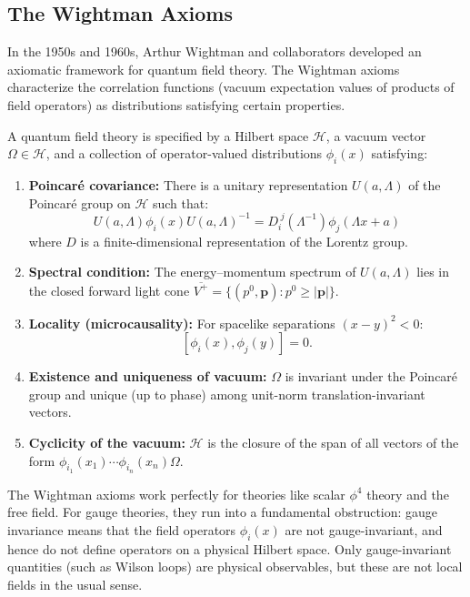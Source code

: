 \subsection{The Wightman Axioms}

In the 1950s and 1960s, Arthur Wightman and collaborators developed an axiomatic framework for quantum field theory. The Wightman axioms characterize the correlation functions (vacuum expectation values of products of field operators) as distributions satisfying certain properties.

\begin{definition}
A quantum field theory is specified by a Hilbert space $\mathcal{H}$, a vacuum vector $\Omega \in \mathcal{H}$, and a collection of operator-valued distributions $\phi_i(x)$ satisfying:
\begin{enumerate}
  \item \textbf{Poincar\'{e} covariance:} There is a unitary representation $U(a, \Lambda)$ of the Poincar\'{e} group on $\mathcal{H}$ such that:
  \[
  U(a, \Lambda) \phi_i(x) U(a, \Lambda)^{-1} = D_i^{\;j}(\Lambda^{-1}) \phi_j(\Lambda x + a)
  \]
  where $D$ is a finite-dimensional representation of the Lorentz group.

  \item \textbf{Spectral condition:} The energy--momentum spectrum of $U(a, \Lambda)$ lies in the closed forward light cone $\overline{V^+} = \{(p^0, \mathbf{p}) : p^0 \ge |\mathbf{p}|\}$.

  \item \textbf{Locality (microcausality):} For spacelike separations $(x - y)^2 < 0$:
  \[
  [\phi_i(x), \phi_j(y)] = 0.
  \]

  \item \textbf{Existence and uniqueness of vacuum:} $\Omega$ is invariant under the Poincar\'{e} group and unique (up to phase) among unit-norm translation-invariant vectors.

  \item \textbf{Cyclicity of the vacuum:} $\mathcal{H}$ is the closure of the span of all vectors of the form $\phi_{i_1}(x_1) \cdots \phi_{i_n}(x_n)\Omega$.
\end{enumerate}
\end{definition}

The Wightman axioms work perfectly for theories like scalar $\phi^4$ theory and the free field. For gauge theories, they run into a fundamental obstruction: gauge invariance means that the field operators $\phi_i(x)$ are not gauge-invariant, and hence do not define operators on a physical Hilbert space. Only gauge-invariant quantities (such as Wilson loops) are physical observables, but these are not local fields in the usual sense.

